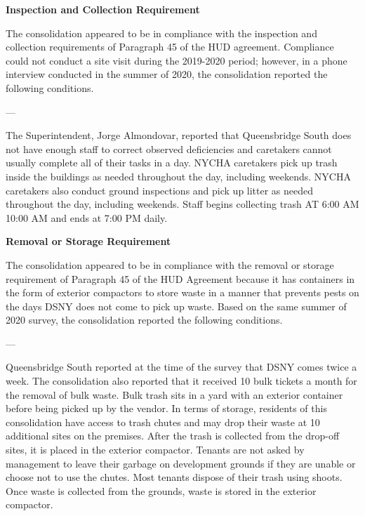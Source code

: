 

\textbf{Inspection and Collection Requirement} 

 

The consolidation appeared to be in compliance with the inspection and collection requirements of Paragraph 45 of the HUD agreement. Compliance could not conduct a site visit during the 2019-2020 period; however, in a phone interview conducted in the summer of 2020, the consolidation reported the following conditions.

 

--- 

The Superintendent, Jorge Almondovar, reported that Queensbridge South does not have enough staff to correct observed deficiencies and caretakers cannot usually complete all of their tasks in a day. NYCHA caretakers pick up trash inside the buildings as needed throughout the day, including weekends. NYCHA caretakers also conduct ground inspections and pick up litter as needed throughout the day, including weekends. Staff begins collecting trash AT 6:00 AM 10:00 AM and ends at 7:00 PM daily. 

 

\textbf{Removal or Storage Requirement} 

The consolidation appeared to be in compliance with the  removal or storage requirement of Paragraph  45 of the HUD Agreement because it has containers in the form of exterior compactors to store waste in a manner that prevents pests on the days DSNY does not come to pick up waste. Based on the same summer of  2020 survey, the consolidation reported the following conditions.

 

--- 

Queensbridge South reported at the time of the survey that DSNY comes twice a week. The consolidation also reported that it received 10 bulk tickets a month for the removal of bulk waste. Bulk trash sits in a yard with an exterior container before being picked up by the vendor. In terms of storage, residents of this consolidation have access to trash chutes and may drop their waste at 10 additional sites on the premises. After the trash is collected from the drop-off sites, it is placed in the exterior compactor. Tenants are not asked by management to leave their garbage on development grounds if they are unable or choose not to use the chutes. Most tenants dispose of their trash using shoots. Once waste is collected from the grounds, waste is stored in the exterior compactor.  

